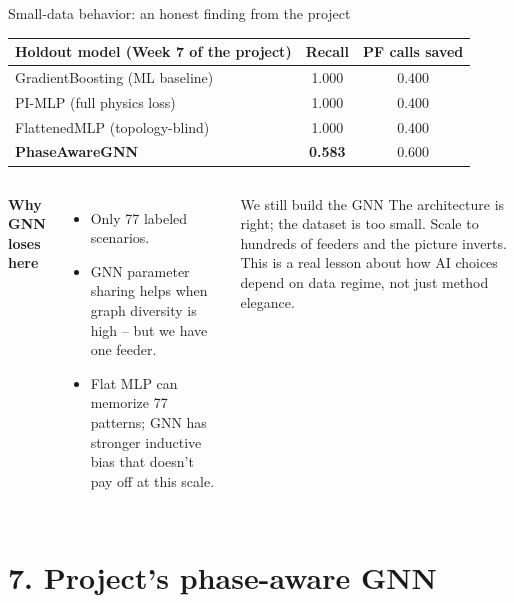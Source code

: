 \documentclass[aspectratio=169,10pt]{beamer}
\begin{document}
\begin{frame}{Small-data behavior: an honest finding from the project}
\centering
\small
\begin{tabular}{lcc}
\toprule
Holdout model (Week 7 of the project) & Recall & PF calls saved \\
\midrule
GradientBoosting (ML baseline) & 1.000 & 0.400 \\
PI-MLP (full physics loss) & 1.000 & 0.400 \\
FlattenedMLP (topology-blind) & 1.000 & 0.400 \\
\textbf{PhaseAwareGNN} & \textbf{0.583} & 0.600 \\
\bottomrule
\end{tabular}
\vspace{0.5em}
\begin{columns}[T]
\textbf{Why GNN loses here}
\begin{itemize}
  \item Only 77 labeled scenarios.
  \item GNN parameter sharing helps when graph diversity is high -- but we have one feeder.
  \item Flat MLP can memorize 77 patterns; GNN has stronger inductive bias that doesn't pay off at this scale.
\end{itemize}
\begin{alertblock}{We still build the GNN}
The architecture is right; the dataset is too small. Scale to hundreds of feeders and the picture inverts. This is a real lesson about how AI choices depend on data regime, not just method elegance.
\end{alertblock}
\end{columns}
\end{frame}

\section*{7. Project's phase-aware GNN}
\end{document}
